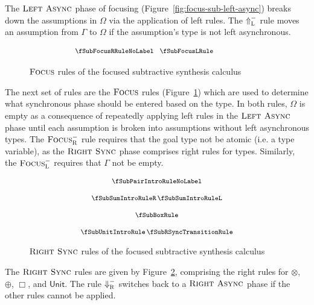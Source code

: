 The $\textsc{Left Async}$ phase of focusing
(Figure~\ref{fig:focus-sub-left-async}) breaks down the assumptions in $\Omega$
via the application of left rules. The $\Uparrow_\textsc{L}^-$ rule moves an
assumption from $\Gamma$ to $\Omega$ if the assumption's type is not left
asynchronous. 

\begin{figure}[H]
  \begin{align*}
    \hspace{-3em}
    {\footnotesize{
\begin{array}{c}
  \fSubFocusRRuleNoLabel
  \;\;\;
  \fSubFocusLRule
  \end{array}
    }}
  \end{align*}
  \caption{$\textsc{Focus}$ rules of the focused subtractive synthesis calculus}
  \label{fig:focus-sub-focus}
\end{figure}

The next set of rules are the $\textsc{Focus}$ rules
(Figure~\ref{fig:focus-sub-focus}) which are used to determine what synchronous
phase should be entered based on the type. In both rules, $\Omega$ is empty as a
consequence of repeatedly applying left rules in the $\textsc{Left Async}$ phase
until each assumption is broken into assumptions without left asynchronous
types. The $\textsc{Focus}_\textsc{R}^-$ rule requires that the goal type not be
atomic (i.e. a type variable), as the $\textsc{Right Sync}$ phase comprises
right rules for types. Similarly, the $\textsc{Focus}_\textsc{L}^-$ requires
that $\Gamma$ not be empty.  

\begin{figure}[H]
  \begin{align*}
    {\footnotesize{
\begin{array}{c}
\fSubPairIntroRuleNoLabel
  \\[1.25em]
  \fSubSumIntroRuleR
  \,
  \fSubSumIntroRuleL
  \\[1.25em]
  \fSubBoxRule
  \\[1.25em]
  \fSubUnitIntroRule
  \,
  \fSubRSyncTransitionRule
  \end{array}
    }}
  \end{align*}
  \caption{$\textsc{Right Sync}$ rules of the focused subtractive synthesis calculus}
  \label{fig:focus-sub-right-sync}
\end{figure}

The $\textsc{Right Sync}$ rules are given by
Figure~\ref{fig:focus-sub-right-sync}, comprising the right rules for $\otimes$,
$\oplus$, $\Box$, and $\mathsf{Unit}$. The rule $\Downarrow_\textsc{R}^-$
switches back to a $\textsc{Right Async}$ phase if the other rules cannot be
applied.


